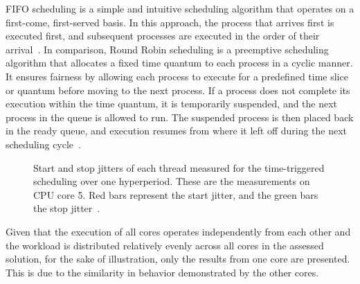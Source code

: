     FIFO scheduling is a simple and intuitive scheduling algorithm that operates on a first-come, first-served basis. In this approach, the process that arrives first is executed first, and subsequent processes are executed in the order of their arrival~\cite{leontyev2007tardiness}. In comparison, Round Robin scheduling is a preemptive scheduling algorithm that allocates a fixed time quantum to each process in a cyclic manner. It ensures fairness by allowing each process to execute for a predefined time slice or quantum before moving to the next process. If a process does not complete its execution within the time quantum, it is temporarily suspended, and the next process in the queue is allowed to run. The suspended process is then placed back in the ready queue, and execution resumes from where it left off during the next scheduling cycle~\cite{rasmussen2008round}.
 

       \begin{figure}[t!]
	\centering
	\caption{Start and stop jitters of each thread measured for the time-triggered scheduling over one hyperperiod. These are the measurements on CPU core 5. Red bars represent the start jitter, and the green bars the stop jitter~\cite{askaripoor2023designer}.}
	\label{fig:jitter}
    \end{figure}
    Given that the execution of all cores operates independently from each other and the workload is distributed relatively evenly across all cores in the assessed solution, for the sake of illustration, only the results from one core are presented. This is due to the similarity in behavior demonstrated by the other cores.

